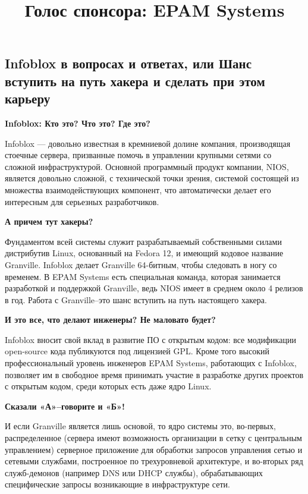 \documentclass[10pt, a5paper]{article}
\begin{document}
\title{Голос спонсора: EPAM Systems}
\date{}
\maketitle

\subsection*{Infoblox в вопросах и ответах, или Шанс вступить на путь хакера и сделать при этом карьеру}

\textbf{Infoblox:  Кто это? Что это? Где это?}

Infoblox --- довольно известная в кремниевой долине компания, производящая стоечные 
сервера, призванные помочь в управлении крупными сетями со сложной инфраструктурой. 
Основной программный продукт компании, NIOS, является довольно сложной, с технической 
точки зрения, системой состоящей из множества взаимодействующих компонент, что 
автоматически делает его интересным для серьезных разработчиков.

\textbf{А причем тут хакеры?}

Фундаментом всей системы служит разрабатываемый собственными силами дистрибутив 
Linux, основанный на Fedora 12, и имеющий кодовое название Granville.  Infoblox делает 
Granville 64-битным, чтобы следовать в ногу со временем. В EPAM Systems есть специальная 
команда, которая занимается разработкой и поддержкой Granville, ведь NIOS имеет в среднем 
около 4 релизов в год. Работа с Granville--это шанс вступить на путь настоящего хакера.

\textbf{И это все, что делают инженеры? Не маловато будет?}

Infoblox вносит свой вклад в развитие ПО с открытым кодом: все модификации open-source 
кода публикуются под лицензией GPL. Кроме того высокий профессиональный уровень 
инженеров EPAM Systems, работающих с Infoblox, позволяет им в свободное время принимать 
участие в разработке других проектов с открытым кодом, среди которых есть даже ядро 
Linux.

\textbf{Сказали «А»--говорите и «Б»!}

И если Granville является лишь основой, то ядро системы это, во-первых, распределенное 
(сервера имеют возможность организации в сетку с центральным управлением) серверное 
приложение для обработки запросов управления сетью и сетевыми службами, построенное 
по трехуровневой архитектуре, и во-вторых ряд служб-демонов (например DNS или DHCP 
службы), обрабатывающих специфические запросы возникающие в инфраструктуре сети.
\end{document}
